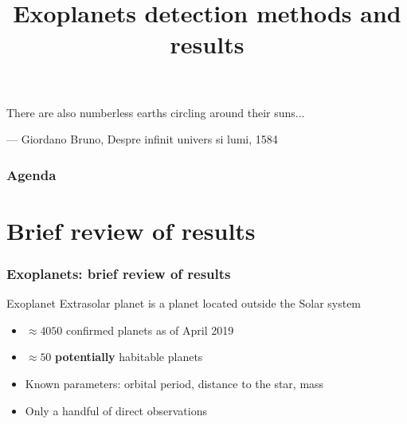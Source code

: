 \documentclass{beamer}
\title[Exoplanets detection methods and results]{Exoplanets detection methods and results}
\author{}
\date{}
\begin{document}
{
\begin{frame}[plain]
\vspace{-5cm}
\small{
\centerline{There are also numberless earths circling around their suns...}
\begin{flushright}
\tiny{--- Giordano Bruno, Despre infinit univers si lumi, 1584}
\end{flushright}
}
\end{frame}
}

\begin{frame}
\frametitle{Agenda}
\tableofcontents
\end{frame}

\section{Brief review of results}
\begin{frame}
\frametitle{Exoplanets: brief review of results}
\begin{block}{Exoplanet}
Extrasolar planet is a planet located outside the Solar system
\end{block}
\begin{itemize}
\item $\approx 4050$ confirmed planets as of April 2019 \cite{exoplanet.eu}
\item $\approx 50$ {\bf potentially} habitable planets
\item Known parameters: orbital period, distance to the star, mass
\item Only a handful of direct observations
\end{itemize}
\end{frame}
\end{document}
